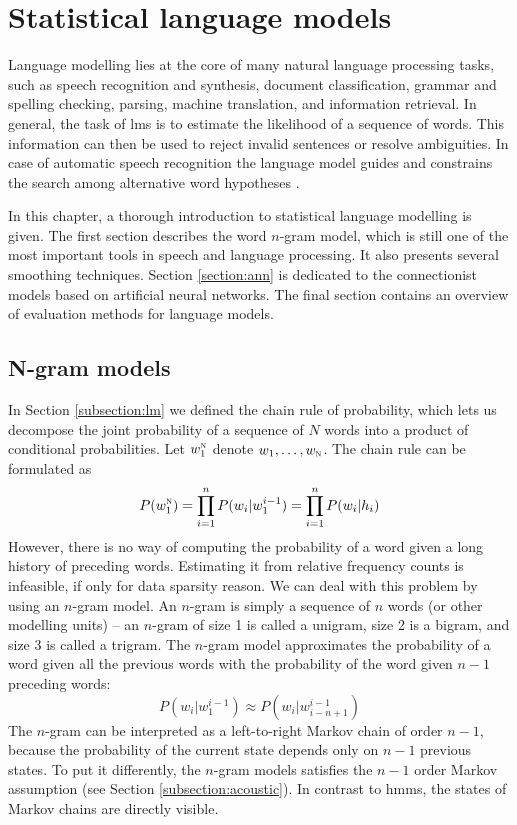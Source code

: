 \chapter{Statistical language models}
\label{chapter:lm}
Language modelling lies at the core of many natural language processing tasks, such as speech recognition and synthesis, document classification, grammar and spelling checking, parsing, machine translation, and information retrieval. In general, the task of \glspl{lm} is to estimate the likelihood of a sequence of words. This information can then be used to reject invalid sentences or resolve ambiguities. In case of automatic speech recognition the language model guides and constrains the search among alternative word hypotheses \cite{glass2013automatic}.

In this chapter, a thorough introduction to statistical language modelling is given. The first section describes the word $n$-gram model, which is still one of the most important tools in speech and language processing. It also presents several smoothing techniques. Section \ref{section:ann} is dedicated to the connectionist models based on artificial neural networks. The final section contains an overview of evaluation methods for language models.
\section{N-gram models}
\label{section:ngrams}
In Section \ref{subsection:lm} we defined the chain rule of probability, which lets us decompose the joint probability of a sequence of $N$ words into a product of conditional probabilities. Let $w_{1}^{\textsc{n}}$ denote $w_{1}, \dots, w_{\textsc{n}}$. The chain rule can be formulated as
\begin{equation}
	\label{equation:chain}
	P(w_{1}^{\textsc{n}})=\prod_{i=1}^{n}P(w_{i}|w_{1}^{i-1})=\prod_{i=1}^{n}P(w_{i}|h_{i})
\end{equation}
However, there is no way of computing the probability of a word given a long history of preceding words. Estimating it from relative frequency counts is infeasible, if only for data sparsity reason. We can deal with this problem by using an $n$-gram model. An $n$-gram is simply a sequence of $n$ words (or other modelling units) -- an $n$-gram of size 1 is called a unigram, size 2 is a bigram, and size 3 is called a trigram. The $n$-gram model approximates the probability of a word given all the previous words with the probability of the word given $n-1$ preceding words:
\begin{equation}
	P(w_{i}|w_{1}^{i-1})\approx P(w_{i}|w_{i-n+1}^{i-1})
\end{equation}
The $n$-gram can be interpreted as a left-to-right Markov chain of order $n-1$, because the probability of the current state depends only on $n-1$ previous states. To put it differently, the $n$-gram models satisfies the $n-1$ order Markov assumption (see Section \ref{subsection:acoustic}). In contrast to \glspl{hmm}, the states of Markov chains are directly visible.

